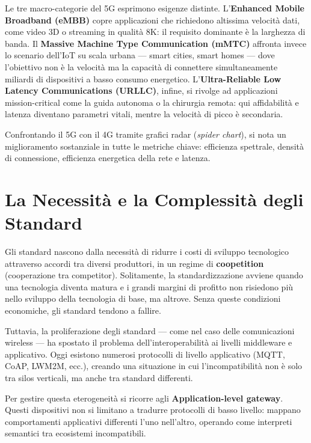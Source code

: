 \documentclass[
  italian,
  openany]{book}
\begin{document}
Le tre macro-categorie del 5G esprimono esigenze distinte.
L'\textbf{Enhanced Mobile Broadband (eMBB)} copre applicazioni che
richiedono altissima velocità dati, come video 3D o streaming in qualità
8K: il requisito dominante è la larghezza di banda. Il \textbf{Massive
Machine Type Communication (mMTC)} affronta invece lo scenario dell'IoT
su scala urbana --- smart cities, smart homes --- dove l'obiettivo non è
la velocità ma la capacità di connettere simultaneamente miliardi di
dispositivi a basso consumo energetico. L'\textbf{Ultra-Reliable Low
Latency Communications (URLLC)}, infine, si rivolge ad applicazioni
mission-critical come la guida autonoma o la chirurgia remota: qui
affidabilità e latenza diventano parametri vitali, mentre la velocità di
picco è secondaria.

Confrontando il 5G con il 4G tramite grafici radar (\emph{spider
chart}), si nota un miglioramento sostanziale in tutte le metriche
chiave: efficienza spettrale, densità di connessione, efficienza
energetica della rete e latenza.

\section{La Necessità e la Complessità degli
Standard}\label{la-necessituxe0-e-la-complessituxe0-degli-standard}

Gli standard nascono dalla necessità di ridurre i costi di sviluppo
tecnologico attraverso accordi tra diversi produttori, in un regime di
\textbf{coopetition} (cooperazione tra competitor). Solitamente, la
standardizzazione avviene quando una tecnologia diventa matura e i
grandi margini di profitto non risiedono più nello sviluppo della
tecnologia di base, ma altrove. Senza queste condizioni economiche, gli
standard tendono a fallire.

Tuttavia, la proliferazione degli standard --- come nel caso delle
comunicazioni wireless --- ha spostato il problema dell'interoperabilità
ai livelli middleware e applicativo. Oggi esistono numerosi protocolli
di livello applicativo (MQTT, CoAP, LWM2M, ecc.), creando una situazione
in cui l'incompatibilità non è solo tra silos verticali, ma anche tra
standard differenti.

Per gestire questa eterogeneità si ricorre agli
\textbf{Application-level gateway}. Questi dispositivi non si limitano a
tradurre protocolli di basso livello: mappano comportamenti applicativi
differenti l'uno nell'altro, operando come interpreti semantici tra
ecosistemi incompatibili.
\end{document}

